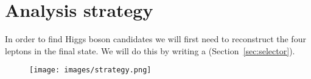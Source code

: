 \section{Analysis strategy}

In order to find Higgs boson candidates we will first need to reconstruct the four leptons in the final state. We will do this by writing a  (Section~\ref{sec:selector}).


\begin{figure}[!h]
    \centering
    \texttt{[image: images/strategy.png]}
\end{figure}